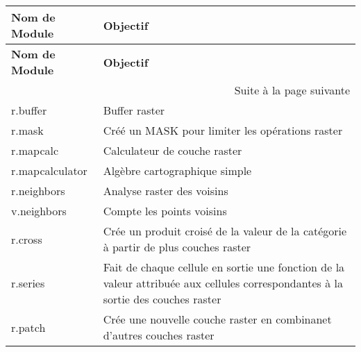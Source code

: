\begin{table}[H]
\centering
{\setlength{\extrarowheight}{10pt}
\small
\begin{longtable}{|p{4cm}|p{10cm}|}
\hline \textbf{Nom de Module}&\textbf{Objectif}\\
\endfirsthead
\textbf{Nom de Module}&\textbf{Objectif}\\
\endhead
\hline \multicolumn{2}{|r|}{{Suite à la page suivante}} \\ \hline
\endfoot
\hline
\endlastfoot
  \hline r.buffer & Buffer raster\\
  \hline r.mask & Créé un MASK pour limiter les opérations raster\\
  \hline r.mapcalc & Calculateur de couche raster \\
  \hline r.mapcalculator & Algèbre cartographique simple \\
  \hline r.neighbors & Analyse raster des voisins\\
  \hline v.neighbors & Compte les points voisins \\
  \hline r.cross & Crée un produit croisé de la valeur de la catégorie à partir de plus couches raster \\
  \hline r.series & Fait de chaque cellule en sortie une fonction de la valeur attribuée aux cellules correspondantes à la sortie des couches raster\\
  \hline r.patch & Crée une nouvelle couche raster en combinanet d'autres couches raster \\

\end{longtable}}
\end{table}
